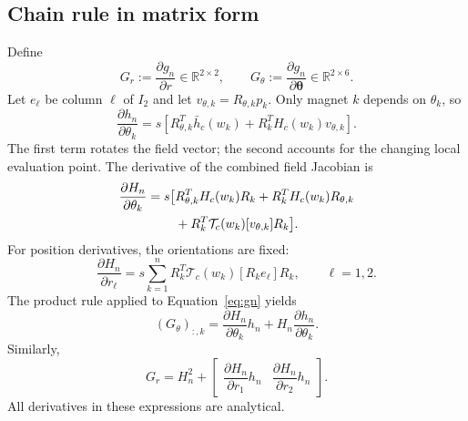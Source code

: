 \documentclass[11pt,a4paper]{article}
\numberwithin{equation}{section}
\newcommand{\R}{\mathbb{R}}
\newcommand{\thv}{\bm{\theta}}
\begin{document}
\subsection{Chain rule in matrix form}
Define
\begin{equation}
G_r:=\frac{\partial g_n}{\partial r}\in\R^{2\times2},\qquad
G_\theta:=\frac{\partial g_n}{\partial\thv}\in\R^{2\times6}.
\label{eq:jac-definitions}
\end{equation}
Let $e_\ell$ be column $\ell$ of $I_2$ and let
$v_{\theta,k}=R_{\theta,k}p_k$. Only magnet $k$ depends on $\theta_k$, so
\begin{equation}
\frac{\partial h_n}{\partial\theta_k}
=s\left[R_{\theta,k}^T\bar h_c(w_k)
+R_k^TH_c(w_k)v_{\theta,k}\right].
\label{eq:dh-angle}
\end{equation}
The first term rotates the field vector; the second accounts for the changing
local evaluation point. The derivative of the combined field Jacobian is
\begin{align}
\frac{\partial H_n}{\partial\theta_k}
=s\big[
&R_{\theta,k}^TH_c(w_k)R_k
+R_k^TH_c(w_k)R_{\theta,k}\notag\\
&+R_k^T\mathcal T_c(w_k)[v_{\theta,k}]R_k\big].
\label{eq:dH-angle}
\end{align}
For position derivatives, the orientations are fixed:
\begin{equation}
\frac{\partial H_n}{\partial r_\ell}
=s\sum_{k=1}^{n}R_k^T\mathcal T_c(w_k)[R_ke_\ell]R_k,
\qquad \ell=1,2.
\label{eq:dH-position}
\end{equation}
The product rule applied to Equation~\eqref{eq:gn} yields
\begin{equation}
\boxed{(G_\theta)_{:,k}
=\frac{\partial H_n}{\partial\theta_k}h_n
+H_n\frac{\partial h_n}{\partial\theta_k}.}
\label{eq:Gtheta-columns}
\end{equation}
Similarly,
\begin{equation}
\boxed{G_r=H_n^2+
\begin{bmatrix}
\dfrac{\partial H_n}{\partial r_1}h_n&
\dfrac{\partial H_n}{\partial r_2}h_n
\end{bmatrix}.}
\label{eq:Gr-columns}
\end{equation}
All derivatives in these expressions are analytical.
\end{document}
